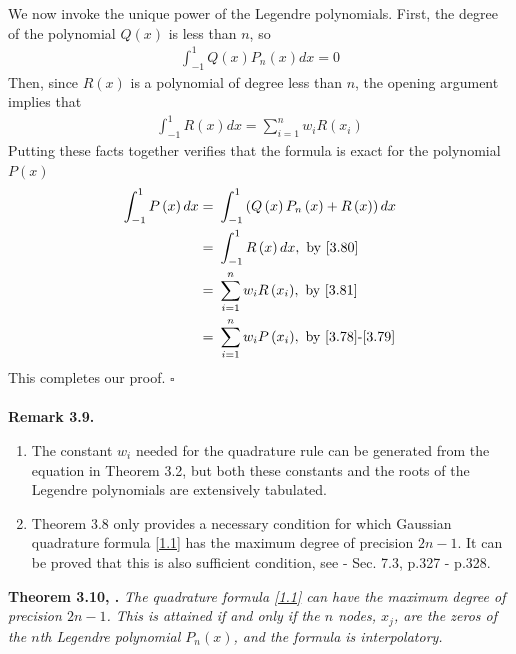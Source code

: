 \documentclass[a4paper]{article}
\numberwithin{equation}{section}
\begin{document}
We now invoke the unique power of the Legendre polynomials. First, the degree of the polynomial $Q\left(x\right)$ is less than $n$, so 
\begin{align}
\label{3.80}
\int_{ - 1}^1 {Q\left( x \right){P_n}\left( x \right)dx}  = 0
\end{align}
Then, since $R\left(x\right)$ is a polynomial of degree less than $n$, the opening argument implies that
\begin{align}
\label{3.81}
\int_{ - 1}^1 {R\left( x \right)dx}  = \sum\limits_{i = 1}^n {{w_i}R\left( {{x_i}} \right)} 
\end{align}
Putting these facts together verifies that the formula is exact for the polynomial $P\left(x\right)$
\begin{align}
\int_{ - 1}^1 {P\left( x \right)dx}  =&\ \int_{ - 1}^1 {\left( {Q\left( x \right){P_n}\left( x \right) + R\left( x \right)} \right)dx} \\
=&\ \int_{ - 1}^1 {R\left( x \right)dx} ,\mbox{ by \eqref{3.80}}\\
=&\ \sum\limits_{i = 1}^n {{w_i}R\left( {{x_i}} \right)}, \mbox{ by \eqref{3.81}}\\
=&\ \sum\limits_{i = 1}^n {{w_i}P\left( {{x_i}} \right)}, \mbox{ by \eqref{3.78}-\eqref{3.79}}
\end{align}
This completes our proof. \hfill $\square$\\
\\
\textbf{Remark 3.9.} 
\begin{enumerate}
\item The constant $w_i$ needed for the quadrature rule can be generated from the equation in Theorem 3.2, but both these constants and the roots of the Legendre polynomials are extensively tabulated.
\item Theorem 3.8 only provides a necessary condition for which Gaussian quadrature formula \eqref{1.1} has the maximum degree of precision $2n-1$. It can be proved that this is also sufficient condition, see \cite{6} - Sec. 7.3, p.327 - p.328.
\end{enumerate}
\textbf{Theorem 3.10, \cite{6}.} \textit{The quadrature formula \eqref{1.1} can have the maximum degree of precision $2n-1$. This is attained if and only if the $n$ nodes, $x_j$, are the zeros of the $n$th Legendre polynomial $P_n\left(x\right)$, and the formula is interpolatory.}\\
\end{document}

